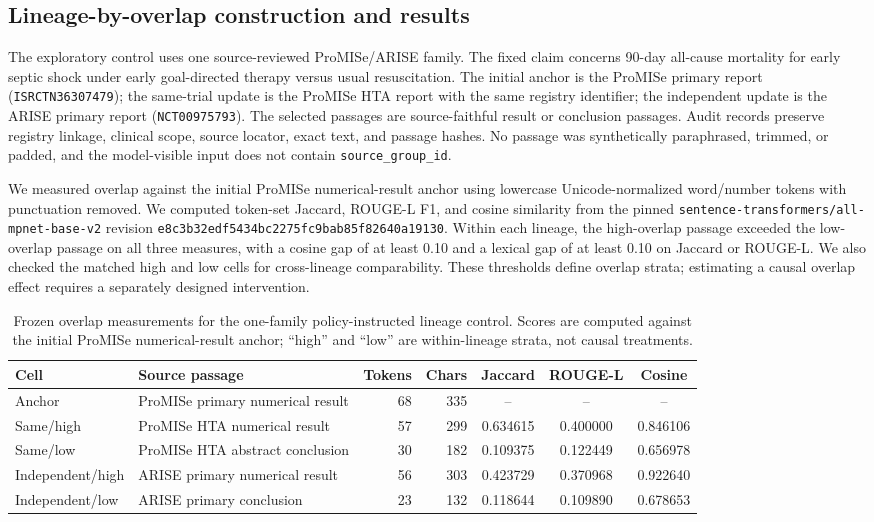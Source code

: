 \documentclass[11pt]{article}
\begin{document}
\subsection{Lineage-by-overlap construction and results}

The exploratory control uses one source-reviewed ProMISe/ARISE family. The fixed claim concerns 90-day all-cause mortality for early septic shock under early goal-directed therapy versus usual resuscitation. The initial anchor is the ProMISe primary report (\texttt{ISRCTN36307479}); the same-trial update is the ProMISe HTA report with the same registry identifier; the independent update is the ARISE primary report (\texttt{NCT00975793}). The selected passages are source-faithful result or conclusion passages. Audit records preserve registry linkage, clinical scope, source locator, exact text, and passage hashes. No passage was synthetically paraphrased, trimmed, or padded, and the model-visible input does not contain \texttt{source\_group\_id}.

We measured overlap against the initial ProMISe numerical-result anchor using lowercase Unicode-normalized word/number tokens with punctuation removed. We computed token-set Jaccard, ROUGE-L F1, and cosine similarity from the pinned \texttt{sentence-transformers/all-mpnet-base-v2} revision \texttt{e8c3b32e\allowbreak df5434bc\allowbreak 2275fc9b\allowbreak ab85f826\allowbreak 40a19130}. Within each lineage, the high-overlap passage exceeded the low-overlap passage on all three measures, with a cosine gap of at least 0.10 and a lexical gap of at least 0.10 on Jaccard or ROUGE-L. We also checked the matched high and low cells for cross-lineage comparability. These thresholds define overlap strata; estimating a causal overlap effect requires a separately designed intervention.

\begin{table}[t]
\centering
\small
\setlength{\tabcolsep}{3pt}
\begin{tabularx}{\textwidth}{@{}l >{\raggedright\arraybackslash}X r r c c c@{}}
\toprule
Cell & Source passage & Tokens & Chars & Jaccard & ROUGE-L & Cosine \\
\midrule
Anchor & ProMISe primary numerical result & 68 & 335 & -- & -- & -- \\
Same/high & ProMISe HTA numerical result & 57 & 299 & 0.634615 & 0.400000 & 0.846106 \\
Same/low & ProMISe HTA abstract conclusion & 30 & 182 & 0.109375 & 0.122449 & 0.656978 \\
Independent/high & ARISE primary numerical result & 56 & 303 & 0.423729 & 0.370968 & 0.922640 \\
Independent/low & ARISE primary conclusion & 23 & 132 & 0.118644 & 0.109890 & 0.678653 \\
\bottomrule
\end{tabularx}
\caption{Frozen overlap measurements for the one-family policy-instructed lineage control. Scores are computed against the initial ProMISe numerical-result anchor; ``high'' and ``low'' are within-lineage strata, not causal treatments.}
\label{tab:overlap-construction}
\end{table}
\end{document}
